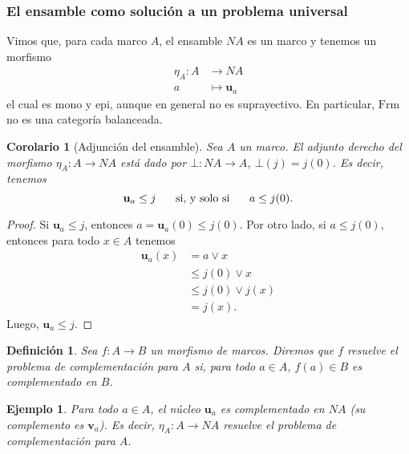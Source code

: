 \documentclass[12pt,letterpaper,titlepage]{article}
\newtheorem*{defn}{Definición}
\newtheorem*{exa}{Ejemplo}
\newtheorem*{cor}{Corolario}
\theoremstyle{definition}
\renewcommand\sup{\vee}
\newcommand\ssi{\hspace{5mm}\text{ si, y solo si }\hspace{5mm}}
\newcommand\unuc[1]{\mathbf u_{#1}}
\newcommand\vnuc[1]{\mathbf v_{#1}}
\newcommand\<{\langle}
\renewcommand\>{\rangle}
\newcommand{\Frm}{\mathrm{Frm}}
\begin{document}

\subsubsection{El ensamble como solución a un problema universal}
\label{ssec:complementacion}

Vimos que, para cada marco $A$, el ensamble $NA$ es un marco y
tenemos un morfismo
\begin{align*}
  \eta_A: A&\to NA \\
  a &\mapsto \unuc a
\end{align*}
el cual es mono y epi, aunque en general no es suprayectivo.
En particular, $\Frm$ no es una categoría balanceada.

\begin{cor}[Adjunción del ensamble]
  Sea $A$ un marco.
  El adjunto derecho del morfismo $\eta_A:A\to NA$ está dado por
  $\bot:NA\to A$, $\bot(j)=j(0)$.
  Es decir, tenemos
  \[
    \unuc a \leq j \ssi a\leq j(0) 
  .\]
\end{cor}
\begin{proof}
  Si $\unuc a \leq j$, entonces
  $a=\unuc a(0) \leq j(0)$.
  Por otro lado, si $a\leq j(0)$, entonces para todo $x\in A$
  tenemos
  \begin{align*}
    \unuc a (x)
    &= a\sup x \\
    &\leq j(0) \sup x \\
    &\leq j(0) \sup j(x) \\
    &= j(x).
  \end{align*}
  Luego, $\unuc a \leq j$.
\end{proof}

\begin{defn}
  Sea $f:A\to B$ un morfismo de marcos.
  Diremos que $f$ resuelve el problema de complementación para
  $A$ si, para todo $a\in A$, $f(a)\in B$ es complementado en
  $B$.
\end{defn}
\begin{exa}
  Para todo $a\in A$, el núcleo $\unuc a$ es complementado en
  $NA$ (su complemento es $\vnuc a$).
  Es decir, $\eta_A:A\to NA$ resuelve el problema de
  complementación para $A$.
\end{exa}
\end{document}

